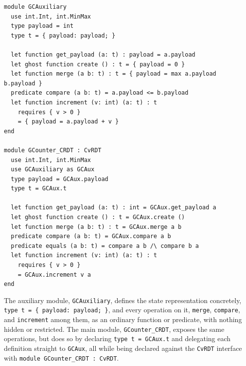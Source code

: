 \begin{lstlisting}[caption={\texttt{GCAuxiliary} and \texttt{GCounter\_CRDT}, as generated for Why3}, label={lst:w3-gcounter}]
module GCAuxiliary
  use int.Int, int.MinMax
  type payload = int
  type t = { payload: payload; }

  let function get_payload (a: t) : payload = a.payload
  let ghost function create () : t = { payload = 0 }
  let function merge (a b: t) : t = { payload = max a.payload b.payload }
  predicate compare (a b: t) = a.payload <= b.payload
  let function increment (v: int) (a: t) : t
    requires { v > 0 }
    = { payload = a.payload + v }
end

module GCounter_CRDT : CvRDT
  use int.Int, int.MinMax
  use GCAuxiliary as GCAux
  type payload = GCAux.payload
  type t = GCAux.t

  let function get_payload (a: t) : int = GCAux.get_payload a
  let ghost function create () : t = GCAux.create ()
  let function merge (a b: t) : t = GCAux.merge a b
  predicate compare (a b: t) = GCAux.compare a b
  predicate equals (a b: t) = compare a b /\ compare b a
  let function increment (v: int) (a: t) : t
    requires { v > 0 }
    = GCAux.increment v a
end
\end{lstlisting}

The auxiliary module, \texttt{GCAuxiliary}, defines the state representation concretely,
\texttt{type t = \{ payload: payload; \}}, and every operation on it, \texttt{merge}, \texttt{compare}, and
\texttt{increment} among them, as an ordinary function or predicate, with nothing hidden or restricted. The main module,
\texttt{GCounter\_CRDT}, exposes the same operations, but does so by declaring \texttt{type t = GCAux.t} and delegating
each definition straight to \texttt{GCAux}, all while being declared against the \texttt{CvRDT} interface with
\texttt{module GCounter\_CRDT : CvRDT}.

